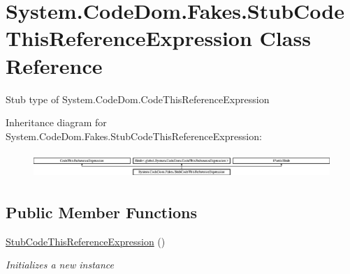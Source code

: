 \hypertarget{class_system_1_1_code_dom_1_1_fakes_1_1_stub_code_this_reference_expression}{\section{System.\-Code\-Dom.\-Fakes.\-Stub\-Code\-This\-Reference\-Expression Class Reference}
\label{class_system_1_1_code_dom_1_1_fakes_1_1_stub_code_this_reference_expression}
}


Stub type of System.\-Code\-Dom.\-Code\-This\-Reference\-Expression 


Inheritance diagram for System.\-Code\-Dom.\-Fakes.\-Stub\-Code\-This\-Reference\-Expression\-:\begin{figure}[H]
\begin{center}
\leavevmode
\includegraphics[height=0.964686cm]{class_system_1_1_code_dom_1_1_fakes_1_1_stub_code_this_reference_expression}
\end{center}
\end{figure}
\subsection*{Public Member Functions}
\begin{DoxyCompactItemize}
\item 
\hyperlink{class_system_1_1_code_dom_1_1_fakes_1_1_stub_code_this_reference_expression_a44b7c1b092f362223f6d2643c369ec64}{Stub\-Code\-This\-Reference\-Expression} ()
\begin{DoxyCompactList}\small\item\em Initializes a new instance\end{DoxyCompactList}\end{DoxyCompactItemize}
